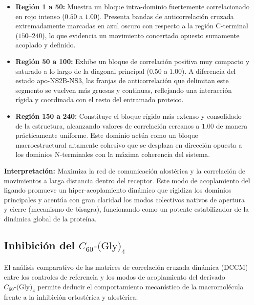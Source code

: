 \begin{itemize}
    \item \textbf{Región 1 a 50:} Muestra un bloque intra-dominio fuertemente correlacionado en rojo intenso ($0.50$ a $1.00$). Presenta bandas de anticorrelación cruzada extremadamente marcadas en azul oscuro  con respecto a la región C-terminal ($150$--$240$), lo que evidencia un movimiento concertado opuesto sumamente acoplado y definido.
    
    \item \textbf{Región 50 a 100:} Exhibe un bloque de correlación positiva muy compacto y saturado a lo largo de la diagonal principal ($0.50$ a $1.00$). A diferencia del estado apo-NS2B-NS3, las franjas de anticorrelación que delimitan este segmento se vuelven más gruesas y continuas, reflejando una interacción rígida y coordinada con el resto del entramado proteico.
    
    \item \textbf{Región 150 a 240:} Constituye el bloque rígido más extenso y consolidado de la estructura, alcanzando valores de correlación cercanos a $1.00$ de manera prácticamente uniforme. Este dominio actúa como un bloque macroestructural altamente cohesivo que se desplaza en dirección opuesta a los dominios N-terminales con la máxima coherencia del sistema.
\end{itemize}

\textbf{Interpretación:} Maximiza la red de comunicación alostérica y la correlación de movimientos a larga distancia dentro del receptor. Este modo de acoplamiento del ligando promueve un hiper-acoplamiento dinámico que rigidiza los dominios principales y acentúa con gran claridad los modos colectivos nativos de apertura y cierre (mecanismo de bisagra), funcionando como un potente estabilizador de la dinámica global de la proteína.

\subsection*{Inhibición del $C_{60}\text{-(Gly)}_4$}

El análisis comparativo de las matrices de correlación cruzada dinámica (DCCM) entre los controles de referencia y los modos de acoplamiento del derivado $C_{60}\text{-(Gly)}_4$ permite deducir el comportamiento mecanístico de la macromolécula frente a la inhibición ortostérica y alostérica:

